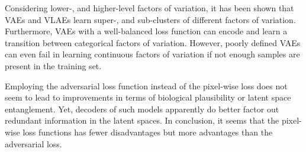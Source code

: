 Considering lower-, and higher-level factors of variation, it has been shown that \acp{VAE} and \acp{VLAE} learn super-, and sub-clusters of different factors of variation.
Furthermore, \acp{VAE} with a well-balanced loss function can encode and learn a transition between categorical factors of variation.
However, poorly defined \acp{VAE} can even fail in learning continuous factors of variation if not enough samples are present in the training set.

Employing the adversarial loss function instead of the pixel-wise loss does not seem to lead to improvements in terms of biological plausibility or latent space entanglement.
Yet, decoders of such models apparently do better factor out redundant information in the latent spaces.
In conclusion, it seems that the pixel-wise loss functions has fewer disadvantages but more advantages than the adversarial loss.
